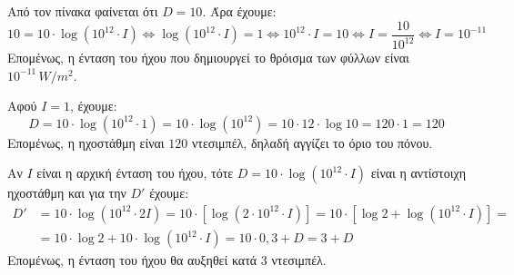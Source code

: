 \begin{alist}
\item Από τον πίνακα φαίνεται ότι $D = 10$. Άρα έχουμε:
\[10 = 10 \cdot \log(10^{12} \cdot I) \Leftrightarrow \log(10^{12} \cdot I) = 1 \Leftrightarrow 10^{12} \cdot I = 10 \Leftrightarrow I = \frac{10}{10^{12}} \Leftrightarrow I = 10^{-11}\]
Επομένως, η ένταση του ήχου που δημιουργεί το θρόισμα των φύλλων είναι $10^{-11} \, W/m^2$.
\item Αφού $I = 1$, έχουμε:
\[D = 10 \cdot \log(10^{12} \cdot 1) = 10 \cdot \log(10^{12}) = 10 \cdot 12 \cdot \log 10 = 120 \cdot 1 = 120\]
Επομένως, η ηχοστάθμη είναι $120$ ντεσιμπέλ, δηλαδή αγγίζει το όριο του πόνου.
\item Αν $I$ είναι η αρχική ένταση του ήχου, τότε $D = 10 \cdot \log(10^{12} \cdot I)$ είναι η αντίστοιχη ηχοστάθμη και για την $D'$ έχουμε:
\begin{align*}
D' &= 10 \cdot \log(10^{12} \cdot 2I) = 10 \cdot [\log(2 \cdot 10^{12} \cdot I)] = 10 \cdot [\log 2 + \log(10^{12} \cdot I)] = \\
&= 10 \cdot \log 2 + 10 \cdot \log(10^{12} \cdot I) = 10 \cdot 0,3 + D = 3 + D
\end{align*}
Επομένως, η ένταση του ήχου θα αυξηθεί κατά $3$ ντεσιμπέλ.
\end{alist}

